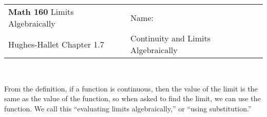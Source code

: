 \documentclass[12pt]{report}
\begin{document}
\begin{tabular*}{\textwidth}{@{\extracolsep{\fill}}ll}
\textbf{Math 160} Limits Algebraically & \;\;Name: \hrulefill \\
 Hughes-Hallet Chapter 1.7& Continuity and Limits Algebraically\hspace{1in}  \\
\hline\hline
\end{tabular*} \\




From the definition, if a function is continuous, then the value of the limit is the same as the value of the function, so when asked to find the limit, we can use the function. We call this ``evaluating limits algebraically,'' or ``using substitution.''\\
\end{document}
